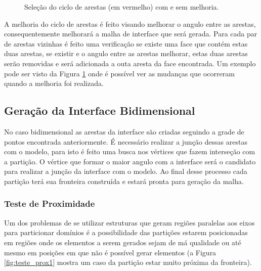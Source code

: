 \begin{figure}[ht]
{	}
	\caption{Seleção do ciclo de arestas (em vermelho) com e sem melhoria.}
	\label{fig:melhoria_arestas_faces}
\end{figure}


A melhoria do ciclo de arestas é feito visando melhorar o angulo entre as arestas, consequentemente melhorará a malha de interface que será gerada. Para cada par de arestas vizinhas é feito uma verificação se existe uma face que contém estas duas arestas, se existir e o angulo entre as arestas melhorar, estas duas arestas serão removidas e será adicionada a outa aresta da face encontrada. Um exemplo pode ser visto da Figura \ref{fig:melhoria_arestas_faces} onde é possível ver as mudanças que ocorreram quando a melhoria foi realizada.

\subsection{Geração da Interface Bidimensional}

No caso bidimensional as arestas da interface são criadas seguindo a grade de pontos encontrada anteriormente. É necessário realizar a junção dessas arestas com o modelo, para isto é feito uma busca nos vértices que fazem interseção com a partição. O vértice que formar o maior angulo com a interface será o candidato para realizar a junção da interface com o modelo. Ao final desse processo cada partição terá sua fronteira construída e estará pronta para geração da malha.


\subsubsection{Teste de Proximidade}
\label{sec:Teste_proximidade}

Um dos problemas de se utilizar estruturas que geram regiões paralelas aos eixos para particionar domínios é a possibilidade das partições estarem posicionadas em regiões onde os elementos a serem gerados sejam de má qualidade ou até mesmo em posições em que não é possível gerar elementos (a Figura \ref{fig:teste_prox1} mostra um caso da partição estar muito próxima da fronteira). 


